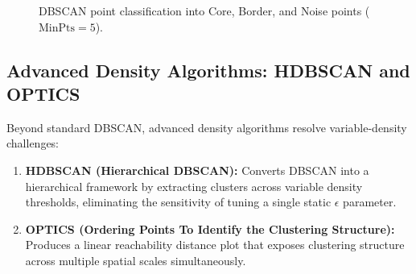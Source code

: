 \begin{figure}[!htbp]
\caption{DBSCAN point classification into Core, Border, and Noise points ($\text{MinPts} = 5$).}
\label{fig:dbscan_points}
\end{figure}

\subsection{Advanced Density Algorithms: HDBSCAN and OPTICS}
Beyond standard DBSCAN, advanced density algorithms resolve variable-density challenges:
\begin{enumerate}
    \item \textbf{HDBSCAN (Hierarchical DBSCAN):} Converts DBSCAN into a hierarchical framework by extracting clusters across variable density thresholds, eliminating the sensitivity of tuning a single static $\epsilon$ parameter.
    \item \textbf{OPTICS (Ordering Points To Identify the Clustering Structure):} Produces a linear reachability distance plot that exposes clustering structure across multiple spatial scales simultaneously.
\end{enumerate}

